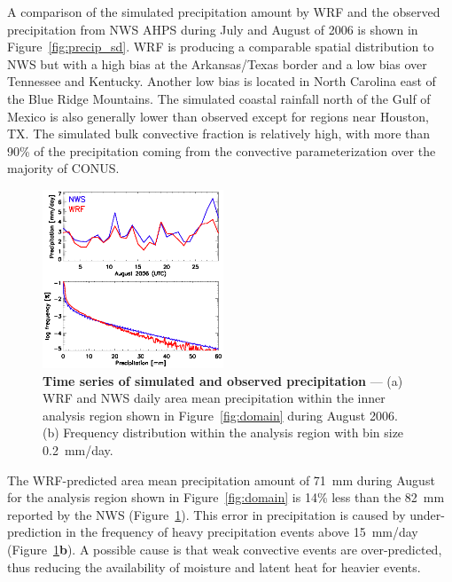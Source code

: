 A comparison of the simulated precipitation amount by WRF and
the observed precipitation from NWS AHPS during July and August of 2006 is shown in Figure~\ref{fig:precip_sd}.
WRF is producing a comparable spatial distribution to NWS but with a high bias at the
Arkansas/Texas border and a low bias over Tennessee and Kentucky. Another low bias
is located in North Carolina east of the Blue Ridge Mountains. The simulated coastal
rainfall north of the Gulf of Mexico is also generally lower than observed except for regions
near Houston, TX. The simulated bulk convective fraction is relatively
high, with more than 90\% of the precipitation coming from the convective parameterization
over the majority of CONUS.

\begin{figure}
	\centering
	\begin{singlespacing}
	\includegraphics[width=0.48\textwidth]{Figures/precip_ts.eps}
	\caption[Time series of simulated and observed precipitation]{{\small\textbf{Time series of simulated and observed precipitation} ---
	(a) WRF and NWS daily area mean precipitation within the inner analysis region shown in Figure~\ref{fig:domain} during August
	2006. (b) Frequency distribution within the analysis region with bin size 0.2~mm/day.}}
	\label{fig:precip_ts}
	\end{singlespacing}
\end{figure}

The WRF-predicted area mean precipitation amount of 71~mm during August for the analysis
region shown in Figure~\ref{fig:domain} is 14\% less than the 82~mm reported by the NWS
(Figure~\ref{fig:precip_ts}). This
error in precipitation is caused by under-prediction in the frequency of heavy precipitation events above
15~mm/day (Figure~\ref{fig:precip_ts}{\bf b}). A possible cause is that weak convective events
are over-predicted, thus reducing the availability of moisture and latent heat for heavier
events.

